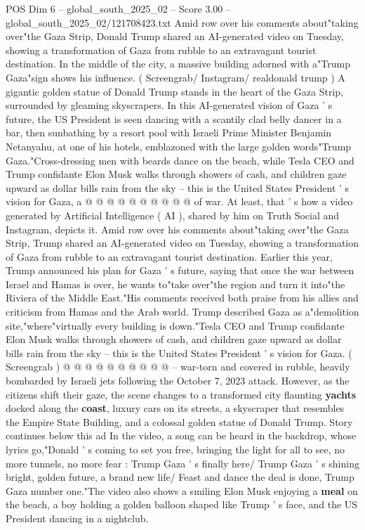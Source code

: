 \begin{textsample}{POS Dim 6 – global\_south\_2025\_02 – Score 3.00 – global\_south\_2025\_02/121708423.txt}  \label{ex:f6_pos_414}
Amid row over his comments about"taking over"the Gaza Strip, Donald Trump shared an AI-generated video on Tuesday, showing a transformation of Gaza from rubble to an extravagant tourist destination.
In the middle of the city, a massive building adorned with a"Trump Gaza"sign shows his influence. ( Screengrab/ Instagram/ realdonald trump ) A gigantic golden statue of Donald Trump stands in the heart of the Gaza Strip, surrounded by gleaming skyscrapers.
In this AI-generated vision of Gaza ' s future, the US President is seen dancing with a scantily clad belly dancer in a bar, then sunbathing by a resort pool with Israeli Prime Minister Benjamin Netanyahu, at one of his hotels, emblazoned with the large golden words"Trump Gaza."Cross-dressing men with beards dance on the beach, while Tesla CEO and Trump confidante Elon Musk walks through showers of cash, and children gaze upward as dollar bills rain from the sky -- this is the United States President ' s vision for Gaza, a @ @ @ @ @ @ @ @ @ @ of war.
At least, that ' s how a video generated by Artificial Intelligence ( AI ), shared by him on Truth Social and Instagram, depicts it.
Amid row over his comments about"taking over"the Gaza Strip, Trump shared an AI-generated video on Tuesday, showing a transformation of Gaza from rubble to an extravagant tourist destination.
Earlier this year, Trump announced his plan for Gaza ' s future, saying that once the war between Israel and Hamas is over, he wants to"take over"the region and turn it into"the Riviera of the Middle East."His comments received both praise from his allies and criticism from Hamas and the Arab world.
Trump described Gaza as a"demolition site,"where"virtually every building is down."Tesla CEO and Trump confidante Elon Musk walks through showers of cash, and children gaze upward as dollar bills rain from the sky -- this is the United States President ' s vision for Gaza. ( Screengrab ) @ @ @ @ @ @ @ @ @ @ -- war-torn and covered in rubble, heavily bombarded by Israeli jets following the October 7, 2023 attack.
However, as the citizens shift their gaze, the scene changes to a transformed city flaunting \textbf{yachts} docked along the \textbf{coast}, luxury cars on its streets, a skyscraper that resembles the Empire State Building, and a colossal golden statue of Donald Trump.
Story continues below this ad In the video, a song can be heard in the backdrop, whose lyrics go,"Donald ' s coming to set you free, bringing the light for all to see, no more tunnels, no more fear : Trump Gaza ' s finally here/ Trump Gaza ' s shining bright, golden future, a brand new life/ Feast and dance the deal is done, Trump Gaza number one."The video also shows a smiling Elon Musk enjoying a \textbf{meal} on the beach, a boy holding a golden balloon shaped like Trump ' s face, and the US President dancing in a nightclub.

\end{textsample}
